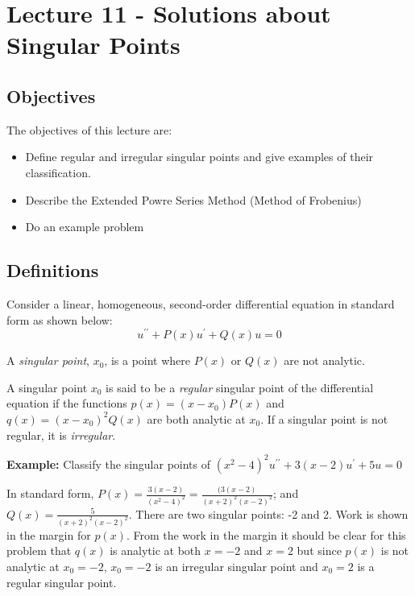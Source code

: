 \chapter{Lecture 11 - Solutions about Singular Points}
\label{ch:lec11}
\section{Objectives}
The objectives of this lecture are:
\begin{itemize}
\item Define regular and irregular singular points and give examples of their classification.
\item Describe the Extended Powre Series Method (Method of Frobenius)
\item Do an example problem
\end{itemize}

\section{Definitions}
Consider a linear, homogeneous, second-order differential equation in standard form as shown below:
\begin{equation*}
u^{\prime \prime} + P(x)u^{\prime} + Q(x)u = 0
\end{equation*}

\begin{definition}
A \emph{singular point}, $x_0$, is a point where $P(x)$ or $Q(x)$ are not analytic.
\end{definition}

\begin{definition}
A singular point $x_0$ is said to be a \emph{regular} singular point of the differential equation if the functions $p(x)=(x-x_0)P(x)$ and $q(x)=(x-x_0)^2Q(x)$ are both analytic at $x_0$.  If a singular point is not regular, it is \emph{irregular}.
\end{definition}

\noindent\textbf{Example:} Classify the singular points of $(x^2-4)^2u^{\prime\prime}+3(x-2)u^{\prime}+5u = 0$

\vspace{0.5cm}

\noindent In standard form, $P(x) = \frac{3(x-2)}{(x^2-4)^2} = \frac{(3(x-2)}{(x+2)^2(x-2)^2}$; and $Q(x) = \frac{5}{(x+2)^2(x-2)^2}$.  There are two singular points: -2 and 2.
Work is shown in the margin for $p(x)$.  From the work in the margin it should be clear for this problem that $q(x)$ is analytic at both $x=-2$ and $x=2$ but since $p(x)$ is not analytic at $x_0=-2$, $x_0=-2$ is an irregular singular point and $x_0=2$ is a regular singular point.

